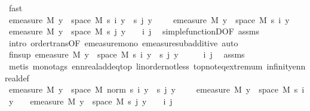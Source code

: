 \begin{isabellebody}
\ fast\isanewline
\isanewline
\ \ \isamarkupfalse%
\ {\isachardoublequoteopen}emeasure\ M\ {\isacharbraceleft}{\kern0pt}y\ {\isasymin}\ space\ M{\isachardot}{\kern0pt}\ s\ i\ y\ {\isacharminus}{\kern0pt}\ s\ j\ y\ {\isasymnoteq}\ {}{\isacharbraceright}{\kern0pt}\ {\isasymle}\ \ emeasure\ M\ {\isacharbraceleft}{\kern0pt}y\ {\isasymin}\ space\ M{\isachardot}{\kern0pt}\ s\ i\ y\ {\isasymnoteq}\ {}{\isacharbraceright}{\kern0pt}\ {\isacharplus}{\kern0pt}\ emeasure\ M\ {\isacharbraceleft}{\kern0pt}y\ {\isasymin}\ space\ M{\isachardot}{\kern0pt}\ s\ j\ y\ {\isasymnoteq}\ {}{\isacharbraceright}{\kern0pt}{\isachardoublequoteclose}\ \ i\ j\ \isamarkupfalse%
\ simple{\isacharunderscore}{\kern0pt}functionD{\isacharparenleft}{\kern0pt}{}{\isacharparenright}{\kern0pt}{\isacharbrackleft}{\kern0pt}OF\ assms{\isacharparenleft}{\kern0pt}{}{\isacharparenright}{\kern0pt}{\isacharbrackright}{\kern0pt}\ \isamarkupfalse%
\ {\isacharparenleft}{\kern0pt}intro\ order{\isacharunderscore}{\kern0pt}trans{\isacharbrackleft}{\kern0pt}OF\ emeasure{\isacharunderscore}{\kern0pt}mono\ emeasure{\isacharunderscore}{\kern0pt}subadditive{\isacharbrackright}{\kern0pt}{\isacharcomma}{\kern0pt}\ auto{\isacharparenright}{\kern0pt}\isanewline
\ \ \isamarkupfalse%
\ fin{\isacharunderscore}{\kern0pt}sup{\isacharcolon}{\kern0pt}\ {\isachardoublequoteopen}emeasure\ M\ {\isacharbraceleft}{\kern0pt}y\ {\isasymin}\ space\ M{\isachardot}{\kern0pt}\ s\ i\ y\ {\isacharminus}{\kern0pt}\ s\ j\ y\ {\isasymnoteq}\ {}{\isacharbraceright}{\kern0pt}\ {\isasymnoteq}\ {\isasyminfinity}{\isachardoublequoteclose}\ \ i\ j\ \isamarkupfalse%
\ assms{\isacharparenleft}{\kern0pt}{}{\isacharparenright}{\kern0pt}\ \isamarkupfalse%
\ {\isacharparenleft}{\kern0pt}metis\ {\isacharparenleft}{\kern0pt}mono{\isacharunderscore}{\kern0pt}tags{\isacharparenright}{\kern0pt}\ ennreal{\isacharunderscore}{\kern0pt}add{\isacharunderscore}{\kern0pt}eq{\isacharunderscore}{\kern0pt}top\ linorder{\isacharunderscore}{\kern0pt}not{\isacharunderscore}{\kern0pt}less\ top{\isachardot}{\kern0pt}not{\isacharunderscore}{\kern0pt}eq{\isacharunderscore}{\kern0pt}extremum\ infinity{\isacharunderscore}{\kern0pt}ennreal{\isacharunderscore}{\kern0pt}def{\isacharparenright}{\kern0pt}\isanewline
\isanewline
\ \ \isamarkupfalse%
\ {\isachardoublequoteopen}emeasure\ M\ {\isacharbraceleft}{\kern0pt}y\ {\isasymin}\ space\ M{\isachardot}{\kern0pt}\ norm\ {\isacharparenleft}{\kern0pt}s\ i\ y\ {\isacharminus}{\kern0pt}\ s\ j\ y{\isacharparenright}{\kern0pt}\ {\isasymnoteq}\ {}{\isacharbraceright}{\kern0pt}\ {\isasymle}\ \ emeasure\ M\ {\isacharbraceleft}{\kern0pt}y\ {\isasymin}\ space\ M{\isachardot}{\kern0pt}\ s\ i\ y\ {\isasymnoteq}\ {}{\isacharbraceright}{\kern0pt}\ {\isacharplus}{\kern0pt}\ emeasure\ M\ {\isacharbraceleft}{\kern0pt}y\ {\isasymin}\ space\ M{\isachardot}{\kern0pt}\ s\ j\ y\ {\isasymnoteq}\ {}{\isacharbraceright}{\kern0pt}{\isachardoublequoteclose}\ \ i\ j\ \isamarkupfalse%

\end{isabellebody}
